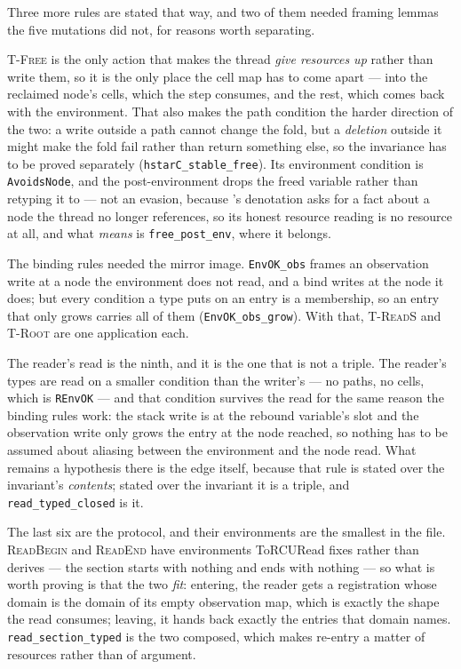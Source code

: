 Three more rules are stated that way, and two of them needed framing lemmas the
five mutations did not, for reasons worth separating.

\textsc{T-Free} is the only action that makes the thread \emph{give resources
up} rather than write them, so it is the only place the cell map has to come
apart --- into the reclaimed node's cells, which the step consumes, and the
rest, which comes back with the environment.  That also makes the path condition
the harder direction of the two: a write outside a path cannot change the fold,
but a \emph{deletion} outside it might make the fold fail rather than return
something else, so the invariance has to be proved separately
(\texttt{hstarC\_stable\_free}).  Its environment condition is
\texttt{AvoidsNode}, and the post-environment drops the freed variable rather
than retyping it to \undf{} --- not an evasion, because \undf{}'s denotation
asks for a fact about a node the thread no longer references, so its honest
resource reading is no resource at all, and what \undf{} \emph{means} is
\texttt{free\_post\_env}, where it belongs.

The binding rules needed the mirror image.  \texttt{EnvOK\_obs} frames an
observation write at a node the environment does not read, and a bind writes at
the node it does; but every condition a type puts on an entry is a membership,
so an entry that only grows carries all of them (\texttt{EnvOK\_obs\_grow}).
With that, \textsc{T-ReadS} and \textsc{T-Root} are one application each.

The reader's read is the ninth, and it is the one that is not a triple.  The
reader's types are read on a smaller condition than the writer's --- no paths,
no cells, which is \texttt{REnvOK} --- and that condition survives the read for
the same reason the binding rules work: the stack write is at the rebound
variable's slot and the observation write only grows the entry at the node
reached, so nothing has to be assumed about aliasing between the environment and
the node read.  What remains a hypothesis there is the edge itself, because
that rule is stated over the invariant's \emph{contents}; stated over the
invariant it is a triple, and \texttt{read\_typed\_closed} is it.

The last six are the protocol, and their environments are the smallest in the
file.  \textsc{ReadBegin} and \textsc{ReadEnd} have environments ToRCURead
fixes rather than derives --- the section starts with nothing and ends with
nothing --- so what is worth proving is that the two \emph{fit}: entering, the
reader gets a registration whose domain is the domain of its empty observation
map, which is exactly the shape the read consumes; leaving, it hands back
exactly the entries that domain names.  \texttt{read\_section\_typed} is the
two composed, which makes re-entry a matter of resources rather than of
argument.

